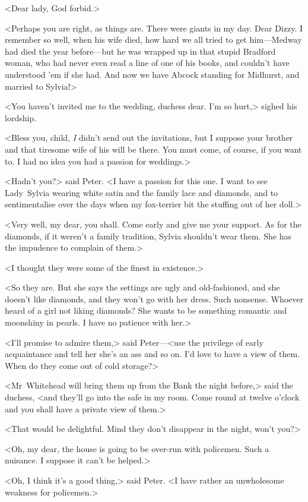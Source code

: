 <Dear lady, God forbid.>

<Perhaps you are right, as things are. There were giants in my day. Dear Dizzy. I remember so well, when his wife died, how hard we all tried to get him—Medway had died the year before—but he was wrapped up in that stupid Bradford woman, who had never even read a line of one of his books, and couldn't have understood 'em if she had. And now we have Abcock standing for Midhurst, and married to Sylvia!>

<You haven't invited me to the wedding, duchess dear. I'm so hurt,> sighed his lordship.

<Bless you, child, \emph{I} didn't send out the invitations, but I suppose your brother and that tiresome wife of his will be there. You must come, of course, if you want to. I had no idea you had a passion for weddings.>

<Hadn't you?> said Peter. <I have a passion for this one. I want to see Lady~Sylvia wearing white satin and the family lace and diamonds, and to sentimentalise over the days when my fox-terrier bit the stuffing out of her doll.>

<Very well, my dear, you shall. Come early and give me your support. As for the diamonds, if it weren't a family tradition, Sylvia shouldn't wear them. She has the impudence to complain of them.>

<I thought they were some of the finest in existence.>

<So they are. But she says the settings are ugly and old-fashioned, and she doesn't like diamonds, and they won't go with her dress. Such nonsense. Whoever heard of a girl not liking diamonds? She wants to be something romantic and moonshiny in pearls. I have no patience with her.>

<I'll promise to admire them,> said Peter—<use the privilege of early acquaintance and tell her she's an ass and so on. I'd love to have a view of them. When do they come out of cold storage?>

<Mr~Whitehead will bring them up from the Bank the night before,> said the duchess, <and they'll go into the safe in my room. Come round at twelve o'clock and you shall have a private view of them.>

<That would be delightful. Mind they don't disappear in the night, won't you?>

<Oh, my dear, the house is going to be over-run with policemen. Such a nuisance. I suppose it can't be helped.>

<Oh, I think it's a good thing,> said Peter. <I have rather an unwholesome weakness for policemen.>

